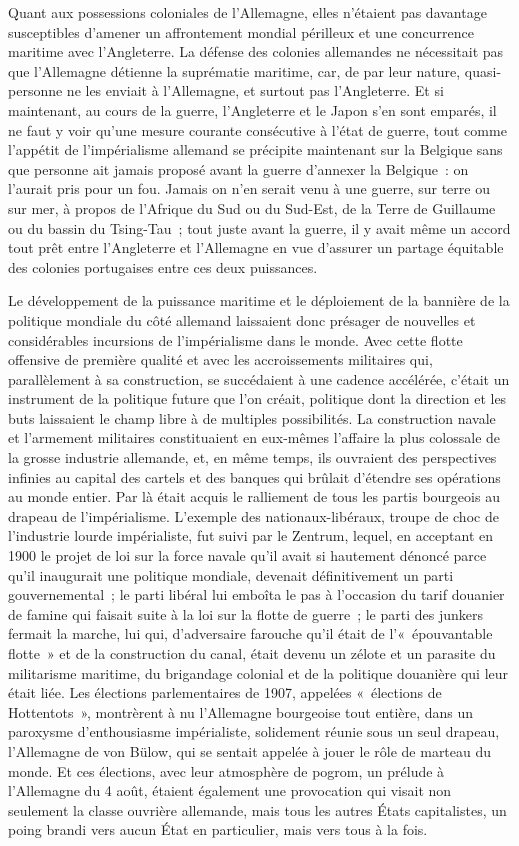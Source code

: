 \documentclass[french,twoside]{book} %
\begin{document}
Quant aux possessions coloniales de l’Allemagne, elles n’étaient pas davantage susceptibles d’amener un affrontement mondial périlleux et une concurrence maritime avec l’Angleterre. La défense des colonies allemandes ne nécessitait pas que l’Allemagne détienne la suprématie maritime, car, de par leur nature, quasi-personne ne les enviait à l’Allemagne, et surtout pas l’Angleterre. Et si maintenant, au cours de la guerre, l’Angleterre et le Japon s’en sont emparés, il ne faut y voir qu’une mesure courante consécutive à l’état de guerre, tout comme l’appétit de l’impérialisme allemand se précipite maintenant sur la Belgique sans que personne ait jamais proposé avant la guerre d’annexer la Belgique : on l’aurait pris pour un fou. Jamais on n’en serait venu à une guerre, sur terre ou sur mer, à propos de l’Afrique du Sud ou du Sud-Est, de la Terre de Guillaume ou du bassin du Tsing-Tau ; tout juste avant la guerre, il y avait même un accord tout prêt entre l’Angleterre et l’Allemagne en vue d’assurer un partage équitable des colonies portugaises entre ces deux puissances.\par
Le développement de la puissance maritime et le déploiement de la bannière de la politique mondiale du côté allemand laissaient donc présager de nouvelles et considérables incursions de l’impérialisme dans le monde. Avec cette flotte offensive de première qualité et avec les accroissements militaires qui, parallèlement à sa construction, se succédaient à une cadence accélérée, c’était un instrument de la politique future que l’on créait, politique dont la direction et les buts laissaient le champ libre à de multiples possibilités. La construction navale et l’armement militaires constituaient en eux-mêmes l’affaire la plus colossale de la grosse industrie allemande, et, en même temps, ils ouvraient des perspectives infinies au capital des cartels et des banques qui brûlait d’étendre ses opérations au monde entier. Par là était acquis le ralliement de tous les partis bourgeois au drapeau de l’impérialisme. L'exemple des nationaux-libéraux, troupe de choc de l’industrie lourde impérialiste, fut suivi par le Zentrum, lequel, en  acceptant en 1900 le projet de loi sur la force navale qu’il avait si hautement dénoncé parce qu’il inaugurait une politique mondiale, devenait définitivement un parti gouvernemental ; le parti libéral lui emboîta le pas à l’occasion du tarif douanier de famine qui faisait suite à la loi sur la flotte de guerre ; le parti des junkers fermait la marche, lui qui, d’adversaire farouche qu’il était de l’« épouvantable flotte » et de la construction du canal, était devenu un zélote et un parasite du militarisme maritime, du brigandage colonial et de la politique douanière qui leur était liée. Les élections parlementaires de 1907, appelées « élections de Hottentots », montrèrent à nu l’Allemagne bourgeoise tout entière, dans un paroxysme d’enthousiasme impérialiste, solidement réunie sous un seul drapeau, l’Allemagne de von Bülow, qui se sentait appelée à jouer le rôle de marteau du monde. Et ces élections, avec leur atmosphère de pogrom, un prélude à l’Allemagne du 4 août, étaient également une provocation qui visait non seulement la classe ouvrière allemande, mais tous les autres États capitalistes, un poing brandi vers aucun État en particulier, mais vers tous à la fois.
\end{document}
